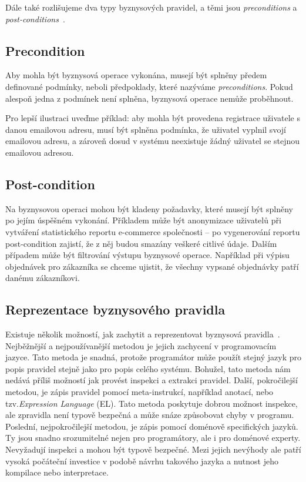 Dále také rozlišujeme dva typy byznysových pravidel, a těmi jsou \textit{preconditions}
a \textit{post-conditions}~\cite{cemus2015automated}.

\subsection{Precondition}

Aby mohla být byznysová operace vykonána, musejí
být splněny předem definované podmínky, neboli předpoklady,
které nazýváme \textit{preconditions}. Pokud alespoň jedna z podmínek
není splněna, byznysová operace nemůže proběhnout.

Pro lepší ilustraci uveďme příklad: aby mohla být provedena
registrace uživatele s danou emailovou adresu, musí být splněna
podmínka, že uživatel vyplnil svojí emailovou adresu, a zároveň
dosud v systému neexistuje žádný uživatel se stejnou emailovou adresou.

\subsection{Post-condition}

Na byznysovou operaci mohou být kladeny požadavky, které
musejí být splněny po jejím úspěšném vykonání. Příkladem
může být anonymizace uživatelů při vytváření statistického
reportu e-commerce společnosti – po vygenerování reportu
post-condition zajistí, že z něj budou smazány veškeré citlivé údaje.
Dalším případem může být filtrování výstupu byznysové operace.
Například při výpisu objednávek pro zákazníka se chceme ujistit, že
všechny vypsané objednávky patří danému zákazníkovi.

\subsection{Reprezentace byznysového pravidla}

Existuje několik možností, jak zachytit a reprezentovat byznysová pravidla~\cite{cemus2015automated}.
Nejběžnější a nejpoužívanější metodou je jejich zachycení v programovacím
jazyce. Tato metoda je snadná, protože programátor může použít stejný jazyk
pro popis pravidel stejně jako pro popis celého systému. Bohužel, tato metoda
nám nedává příliš možností jak provést inspekci a extrakci pravidel.
Další, pokročilejší metodou, je zápis pravidel pomocí meta-instrukcí, například anotací,
nebo tzv.\textit{Expression Language} (EL). Tato metoda poskytuje dobrou možnost inspekce,
ale zpravidla není typově bezpečná a může snáze způsobovat chyby v programu.
Poslední, nejpokročilejší metodou, je zápis pomocí doménově specifických jazyků.
Ty jsou snadno srozumitelné nejen pro programátory, ale i pro doménové experty.
Nevyžadují inspekci a mohou být typově bezpečné. Mezi jejich nevýhody ale patří vysoká
počáteční investice v podobě návrhu takového jazyka a nutnost jeho kompilace nebo
interpretace.

